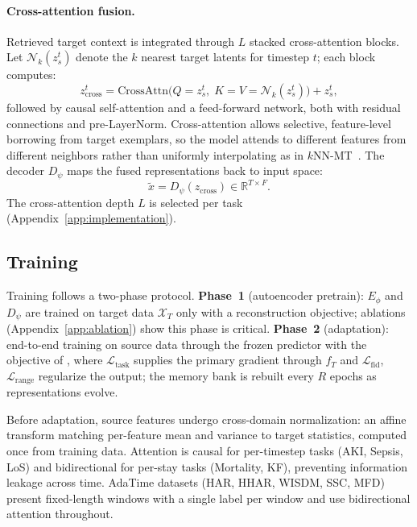 \paragraph{Cross-attention fusion.}
Retrieved target context is integrated through $L$ stacked cross-attention blocks.
Let $\mathcal{N}_k(z_s^t)$ denote the $k$ nearest target latents for timestep $t$; each block computes:
%
\begin{equation}
\label{eq:cross}
z_{\mathrm{cross}}^t = \mathrm{CrossAttn}\!\bigl(Q{=}z_s^t,\; K{=}V{=}\mathcal{N}_k(z_s^t)\bigr) + z_s^t,
\end{equation}
%
followed by causal self-attention and a feed-forward network, both with residual connections and pre-LayerNorm.
Cross-attention allows selective, feature-level borrowing from target exemplars, so the model attends to different features from different neighbors rather than uniformly interpolating as in $k$NN-MT~\citep{khandelwal2021knnmt}.
The decoder $D_\psi$ maps the fused representations back to input space:
%
\begin{equation}
\label{eq:decode}
\tilde{x} = D_\psi(z_{\mathrm{cross}}) \in \mathbb{R}^{T \times F}.
\end{equation}
%
The cross-attention depth $L$ is selected per task (Appendix~\ref{app:implementation}).

\subsection{Training}
\label{sec:training}

Training follows a two-phase protocol.
\textbf{Phase~1} (autoencoder pretrain): $E_\phi$ and $D_\psi$ are trained on target data $\mathcal{X}_T$ only with a reconstruction objective; ablations (Appendix~\ref{app:ablation}) show this phase is critical.
\textbf{Phase~2} (adaptation): end-to-end training on source data through the frozen predictor with the objective of , where $\mathcal{L}_{\mathrm{task}}$ supplies the primary gradient through $f_T$ and $\mathcal{L}_{\mathrm{fid}}$, $\mathcal{L}_{\mathrm{range}}$ regularize the output; the memory bank is rebuilt every $R$ epochs as representations evolve.

Before adaptation, source features undergo cross-domain normalization: an affine transform matching per-feature mean and variance to target statistics, computed once from training data.
Attention is causal for per-timestep tasks (AKI, Sepsis, LoS) and bidirectional for per-stay tasks (Mortality, KF), preventing information leakage across time. AdaTime datasets (HAR, HHAR, WISDM, SSC, MFD) present fixed-length windows with a single label per window and use bidirectional attention throughout.

